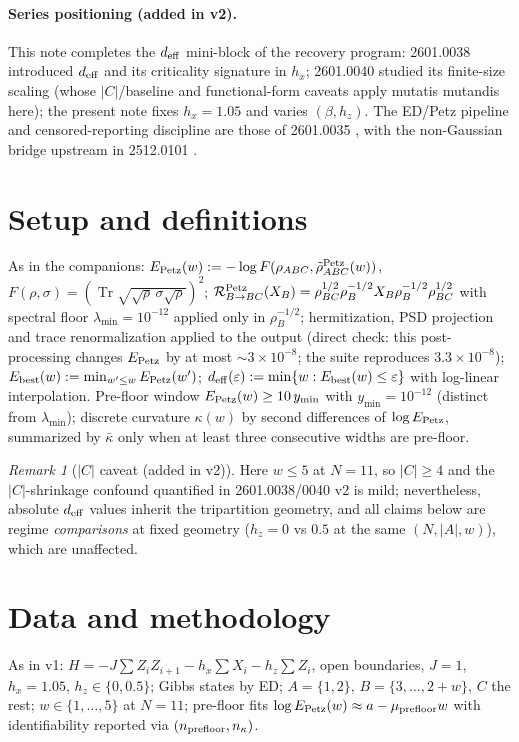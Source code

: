\documentclass[11pt]{article}
\theoremstyle{remark}
\newtheorem{remark}{Remark}[section]
\newcommand{\Tr}{\operatorname{Tr}}
\newcommand{\deff}{d_{\rm eff}}
\begin{document}
\paragraph{Series positioning (added in v2).} This note completes the
$\deff$ mini-block of the recovery program: 2601.0038 \cite{S0038}
introduced $\deff$ and its criticality signature in $h_x$; 2601.0040
\cite{S0040} studied its finite-size scaling (whose $|C|$/baseline and
functional-form caveats apply mutatis mutandis here); the present note
fixes $h_x = 1.05$ and varies $(\beta, h_z)$. The ED/Petz pipeline and
censored-reporting discipline are those of 2601.0035 \cite{S0035}, with
the non-Gaussian bridge upstream in 2512.0101 \cite{S0101}.

\section{Setup and definitions}
As in the companions: $E_{\rm Petz}(w) := -\log F(\rho_{ABC},
\tilde\rho^{\rm Petz}_{ABC}(w))$, $F(\rho,\sigma) =
(\Tr\sqrt{\sqrt\rho\,\sigma\sqrt\rho})^2$;
$\mathcal{R}^{\rm Petz}_{B\to BC}(X_B) = \rho_{BC}^{1/2}\rho_B^{-1/2}
X_B \rho_B^{-1/2}\rho_{BC}^{1/2}$ with spectral floor
$\lambda_{\min} = 10^{-12}$ applied only in $\rho_B^{-1/2}$;
hermitization, PSD projection and trace renormalization applied to the
output (direct check: this post-processing changes $E_{\rm Petz}$ by at
most $\sim 3\times10^{-8}$; the suite reproduces $3.3\times10^{-8}$);
$E_{\rm best}(w) := \min_{w' \le w} E_{\rm Petz}(w')$;
$\deff(\varepsilon) := \min\{w : E_{\rm best}(w) \le \varepsilon\}$ with
log-linear interpolation. Pre-floor window $E_{\rm Petz}(w) \ge
10\,y_{\min}$ with $y_{\min} = 10^{-12}$ (distinct from
$\lambda_{\min}$); discrete curvature $\kappa(w)$ by second differences
of $\log E_{\rm Petz}$, summarized by $\bar\kappa$ only when at least
three consecutive widths are pre-floor.

\begin{remark}[$|C|$ caveat (added in v2)]
Here $w \le 5$ at $N = 11$, so $|C| \ge 4$ and the $|C|$-shrinkage
confound quantified in 2601.0038/0040 v2 is mild; nevertheless, absolute
$\deff$ values inherit the tripartition geometry, and all claims below
are regime \emph{comparisons} at fixed geometry ($h_z = 0$ vs $0.5$ at
the same $(N, |A|, w)$), which are unaffected.
\end{remark}

\section{Data and methodology}
As in v1: $H = -J\sum Z_iZ_{i+1} - h_x\sum X_i - h_z\sum Z_i$, open
boundaries, $J = 1$, $h_x = 1.05$, $h_z \in \{0, 0.5\}$; Gibbs states by
ED; $A = \{1,2\}$, $B = \{3,\dots,2{+}w\}$, $C$ the rest; $w \in
\{1,\dots,5\}$ at $N = 11$; pre-floor fits $\log E_{\rm Petz}(w) \approx
a - \mu_{\rm prefloor} w$ with identifiability reported via
$(n_{\rm prefloor}, n_\kappa)$.
\end{document}
